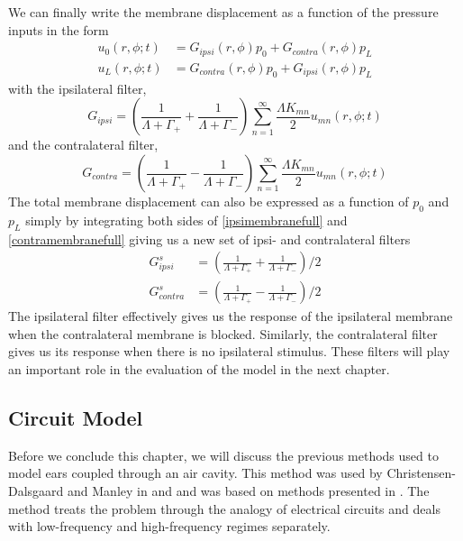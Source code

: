 We can finally write the membrane displacement as a function of the pressure inputs in the form
\begin{align}
 u_0(r,\phi;t)&=G_{ipsi}(r,\phi)p_0+G_{contra}(r,\phi)p_L\label{ipsimembranefull}\\
 u_L(r,\phi;t)&=G_{contra}(r,\phi)p_0+G_{ipsi}(r,\phi)p_L\label{contramembranefull}
\end{align}
with the ipsilateral filter,
\begin{equation}\label{filterdefs1}
 G_{ipsi}=\left(\frac{1}{\Lambda+\Gamma_+}+\frac{1}{\Lambda+\Gamma_-}\right)\displaystyle\sum^\infty_{n=1}\frac{\Lambda K_{mn}}{2}u_{mn}(r,\phi;t)
\end{equation}
and the contralateral filter,
\begin{equation}
 G_{contra}=\left(\frac{1}{\Lambda+\Gamma_+}-\frac{1}{\Lambda+\Gamma_-}\right)\displaystyle\sum^\infty_{n=1}\frac{\Lambda K_{mn}}{2}u_{mn}(r,\phi;t)
\end{equation}
The total membrane displacement can also be expressed as a function of $p_0$ and $p_L$ simply by integrating both sides of \eqref{ipsimembranefull}
and \eqref{contramembranefull} giving us a new set of ipsi- and contralateral filters
\begin{align}
 G^s_{ipsi}&=\left(\frac{1}{\Lambda+\Gamma_+}+\frac{1}{\Lambda+\Gamma_-}\right)/2 \label{ipsimembranetotal}\\
 G^s_{contra}&=\left(\frac{1}{\Lambda+\Gamma_+}-\frac{1}{\Lambda+\Gamma_-}\right)/2 \label{contramembranetotal}
\end{align}
The ipsilateral filter effectively gives us the response of the ipsilateral membrane when the contralateral membrane
is blocked. Similarly, the contralateral filter gives us its response when there is no ipsilateral stimulus. These filters
will play an important role in the evaluation of the model in the next chapter.

\subsection{Circuit Model}
Before we conclude this chapter, we will discuss the previous methods used to model ears coupled through
an air cavity. This method was used by Christensen-Dalsgaard and Manley in \cite{dalsgaardmanley1} and \cite{dalsgaardmanley2}
and was based on methods presented in \cite{fletcheracoustic}. The method treats the problem through the analogy of electrical circuits
and deals with low-frequency and high-frequency regimes separately.

